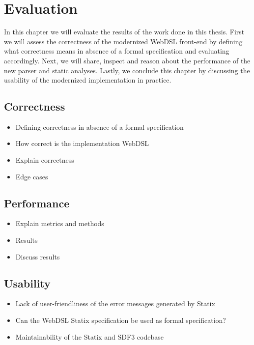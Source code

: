 
\chapter{\label{chap:evaluation}Evaluation}

In this chapter we will evaluate the results of the work done in this thesis. First we will assess the correctness of the modernized WebDSL front-end by defining what correctness means in absence of a formal specification and evaluating accordingly. Next, we will share, inspect and reason about the performance of the new parser and static analyses. Lastly, we conclude this chapter by discussing the usability of the modernized implementation in practice.

\section{\label{sec:correctness}Correctness}

  \begin{itemize}
    \item Defining correctness in absence of a formal specification
    \item How correct is the implementation WebDSL
    \item Explain correctness
    \item Edge cases
  \end{itemize}

\section{\label{sec:performance}Performance}

  \begin{itemize}
    \item Explain metrics and methods
    \item Results
    \item Discuss results
  \end{itemize}

\section{\label{sec:usability}Usability}

  \begin{itemize}
    \item Lack of user-friendliness of the error messages generated by Statix
    \item Can the WebDSL Statix specification be used as formal specification?
    \item Maintainability of the Statix and SDF3 codebase
  \end{itemize}
